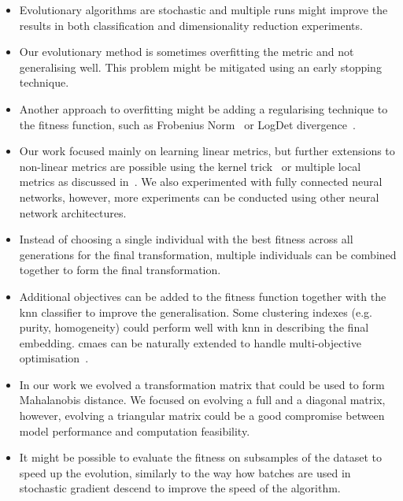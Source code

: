 \documentclass[12pt,a4paper]{report}
\begin{document}
\begin{itemize}
\item Evolutionary algorithms are stochastic and multiple runs might improve the results in both classification and dimensionality reduction experiments.

\item Our evolutionary method is sometimes overfitting the metric and not generalising well. This problem might be mitigated using an early stopping technique.

\item Another approach to overfitting might be adding a regularising technique to the fitness function, such as Frobenius Norm~\citep{schultz2003learning} or LogDet divergence~\citep{davis2007information}.

\item Our work focused mainly on learning linear metrics, but further extensions to non-linear metrics are possible using the kernel trick~\citep{chatpatanasiri2010new} or multiple local metrics as discussed in~\citep{bellet2013survey}. We also experimented with fully connected neural networks, however, more experiments can be conducted using other neural network architectures.

\item Instead of choosing a single individual with the best fitness across all generations for the final transformation, multiple individuals can be combined together to form the final transformation.

\item Additional objectives can be added to the fitness function together with the \ac{knn} classifier to improve the generalisation. Some clustering indexes (e.g. purity, homogeneity) could perform well with \ac{knn} in describing the final embedding. \ac{cmaes} can be naturally extended to handle multi-objective optimisation~\citep{igel2007covariance}.

\item In our work we evolved a transformation matrix that could be used to form Mahalanobis distance. We focused on evolving a full and a diagonal matrix, however, evolving a triangular matrix could be a good compromise between model performance and computation feasibility.

\item It might be possible to evaluate the fitness on subsamples of the dataset to speed up the evolution, similarly to the way how batches are used in stochastic gradient descend to improve the speed of the algorithm.
\end{itemize}
\end{document}
